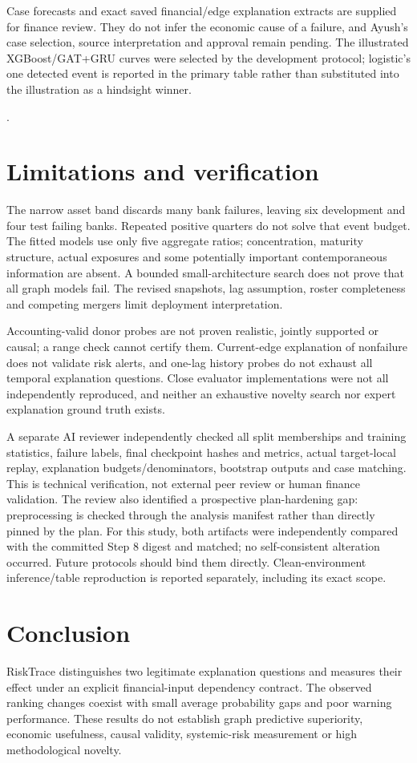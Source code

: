 \documentclass[11pt]{article}
\begin{document}
Case forecasts and exact saved financial/edge explanation extracts are supplied for finance review. They do not infer the economic cause of a failure, and Ayush's case selection, source interpretation and approval remain pending. The illustrated XGBoost/GAT+GRU curves were selected by the development protocol; logistic's one detected event is reported in the primary table rather than substituted into the illustration as a hindsight winner.

\citep{owen2007}.
\section{Limitations and verification}
The narrow asset band discards many bank failures, leaving six development and four test failing banks. Repeated positive quarters do not solve that event budget. The fitted models use only five aggregate ratios; concentration, maturity structure, actual exposures and some potentially important contemporaneous information are absent. A bounded small-architecture search does not prove that all graph models fail. The revised snapshots, lag assumption, roster completeness and competing mergers limit deployment interpretation.

Accounting-valid donor probes are not proven realistic, jointly supported or causal; a range check cannot certify them. Current-edge explanation of nonfailure does not validate risk alerts, and one-lag history probes do not exhaust all temporal explanation questions. Close evaluator implementations were not all independently reproduced, and neither an exhaustive novelty search nor expert explanation ground truth exists.

A separate AI reviewer independently checked all split memberships and training statistics, failure labels, final checkpoint hashes and metrics, actual target-local replay, explanation budgets/denominators, bootstrap outputs and case matching. This is technical verification, not external peer review or human finance validation. The review also identified a prospective plan-hardening gap: preprocessing is checked through the analysis manifest rather than directly pinned by the plan. For this study, both artifacts were independently compared with the committed Step 8 digest and matched; no self-consistent alteration occurred. Future protocols should bind them directly. Clean-environment inference/table reproduction is reported separately, including its exact scope.

\section{Conclusion}
RiskTrace distinguishes two legitimate explanation questions and measures their effect under an explicit financial-input dependency contract. The observed ranking changes coexist with small average probability gaps and poor warning performance. These results do not establish graph predictive superiority, economic usefulness, causal validity, systemic-risk measurement or high methodological novelty.
\end{document}
